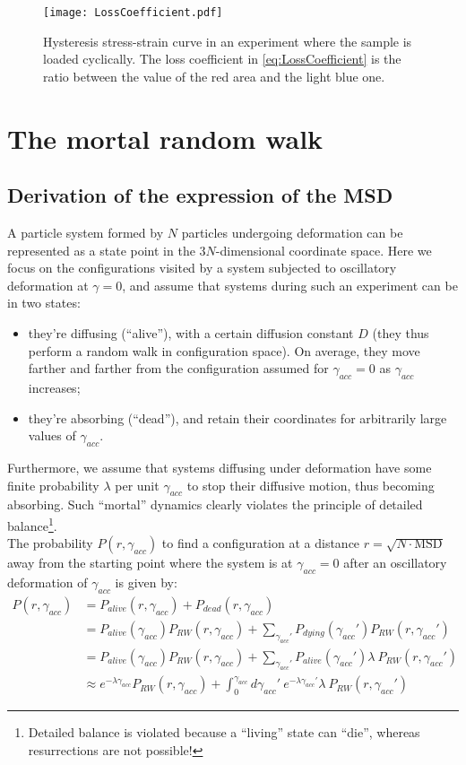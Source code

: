 \begin{figure}[h!] 
\centering 
\texttt{[image: LossCoefficient.pdf]} 
\caption{Hysteresis stress-strain curve in an experiment where the sample is loaded cyclically. The loss coefficient in \autoref{eq:LossCoefficient} is the ratio between the value of the red area and the light blue one. \label{fig:LossCoefficient}}
\end{figure}

\chapter{The mortal random walk \label{app:MortalRandomWalk}}

\section*{Derivation of the expression of the MSD}

A particle system formed by $N$ particles undergoing deformation can be represented as a state point in the $3N$-dimensional coordinate space. 
Here we focus on the configurations visited by a system subjected to oscillatory deformation at $\gamma = 0$, and assume that systems during such an experiment can be in two states:
\begin{itemize}
	\item they're diffusing (``alive''), with a certain diffusion constant $D$ (they thus perform a random walk in configuration space). On average, they move farther and farther from the configuration assumed for $\gamma_{acc} = 0$ as $\gamma_{acc}$ increases;
	\item they're absorbing (``dead''), and retain their coordinates for arbitrarily large values of $\gamma_{acc}$.
\end{itemize}
Furthermore, we assume that systems diffusing under deformation have some finite probability $\lambda$ per unit $\gamma_{acc}$ to stop their diffusive motion, thus becoming absorbing. Such ``mortal'' dynamics clearly violates the principle of detailed balance\footnote{Detailed balance is violated because a ``living'' state can ``die'', whereas resurrections are not possible!}. \\

The probability $P(r, \gamma_{acc})$ to find a configuration at a distance $r = \sqrt{N \cdot \text{MSD}}$ away from the starting point where the system is at $\gamma_{acc} = 0$ after an oscillatory deformation of $\gamma_{acc}$ is given by:
\begin{align}
	P(r, \gamma_{acc}) 	&= P_{alive}(r, \gamma_{acc}) + P_{dead}(r, \gamma_{acc}) \\
						&= P_{alive}(\gamma_{acc}) P_{RW}(r,\gamma_{acc}) + \sum_{\gamma_{acc}'} P_{dying}(\gamma_{acc}') P_{RW}(r,\gamma_{acc}') \\
						&= P_{alive}(\gamma_{acc}) P_{RW}(r,\gamma_{acc}) + \sum_{\gamma_{acc}'} P_{alive}(\gamma_{acc}') \lambda\ P_{RW}(r,\gamma_{acc}') \\
						&\approx e^{-\lambda \gamma_{acc}} P_{RW}(r,\gamma_{acc}) + \int_{0}^{\gamma_{acc}} d\gamma_{acc}'\ e^{-\lambda \gamma_{acc}'} \lambda\ P_{RW}(r,\gamma_{acc}')
\end{align}

